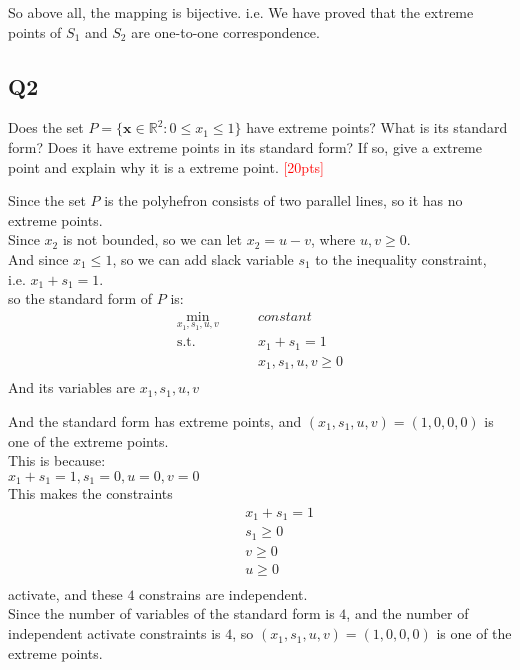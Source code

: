 \documentclass[10pt]{article}
\begin{document}
So above all, the mapping is bijective. i.e. We have proved that the extreme points of $S_1$ and $S_2$ are one-to-one correspondence.\\

\newpage
\subsection{Q2}
Does the set $P = \{ \bm{x} \in \mathbb{R}^{2} : 0 \leq x_{1} \leq 1 \}$ have extreme points? What is its standard form? Does it have extreme points in its standard form? If so, give a extreme point and explain why it is a extreme point.
\textcolor{red}{[20pts]}

Since the set $P$ is the polyhefron consists of two parallel lines, so it has no extreme points.\\

Since $x_2$ is not bounded, so we can let $x_2=u-v$, where $u,v\geq 0$.\\
And since $x_1\leq 1$, so we can add slack variable $s_1$ to the inequality constraint,\\
i.e. $x_1+s_1=1$.\\

so the standard form of $P$ is:\\
\begin{equation}
	\begin{aligned}
		\min_{x_1,s_1,u,v}\qquad & constant \\ 
		\mathrm{s.t.}\qquad & x_1+s_1=1 \\
							& x_1,s_1,u,v\geq 0 \\
	\end{aligned}
\end{equation}
And its variables are $x_1,s_1,u,v$

And the standard form has extreme points, and $(x_1,s_1,u,v)=(1,0,0,0)$ is one of the extreme points.\\
This is because:\\
$x_1+s_1=1, s_1=0, u=0, v=0$\\
This makes the constraints 
\begin{equation}
	\begin{aligned}
		\qquad & x_1+s_1=1 \\
			   & s_1\geq 0 \\
			   & v\geq 0 \\
			   & u\geq 0 \\
	\end{aligned}
\end{equation}
activate, and these $4$ constrains are independent.\\
Since the number of variables of the standard form is $4$, and the number of independent activate constraints is $4$, so $(x_1,s_1,u,v)=(1,0,0,0)$ is one of the extreme points.\\ 
\end{document}
